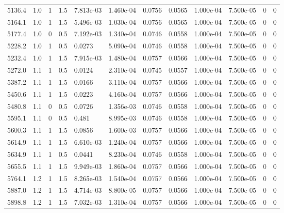 \documentclass[preview]{standalone}
\begin{document}
{{{\begin{tabular}{L{1.2cm}C{1.2cm} C{0.3cm}C{0.5cm} C{1.4cm}C{1.4cm} C{1.4cm}C{1.4cm} C{1.6cm}C{1.6cm} C{1.6cm}C{1.6cm}}
  5136.4  &   1.0  & 1     & 1.5 &  7.813e-03  & 1.460e-04  &  0.0756&   0.0565& 1.000e-04 & 7.500e-05   &  0 & 0  \\ 
  5164.1  &   1.0  & 1     & 1.5 &  5.496e-03  & 1.030e-04  &  0.0756&   0.0565& 1.000e-04 & 7.500e-05   &  0 & 0  \\ 
  5177.4  &   1.0  & 0     & 0.5 &  7.192e-03  & 1.340e-04  &  0.0746&   0.0558& 1.000e-04 & 7.500e-05   &  0 & 0  \\ 
  5228.2  &   1.0  & 1     & 0.5 &  0.0273  & 5.090e-04  &  0.0746&   0.0558& 1.000e-04 & 7.500e-05   &  0 & 0  \\ 
  5232.4  &   1.0  & 1     & 1.5 &  7.915e-03  & 1.480e-04  &  0.0757&   0.0566& 1.000e-04 & 7.500e-05   &  0 & 0  \\ 
  5272.0  &   1.1  & 1     & 0.5 &  0.0124  & 2.310e-04  &  0.0745&   0.0557& 1.000e-04 & 7.500e-05   &  0 & 0  \\ 
  5387.2  &   1.1  & 1     & 1.5 &  0.0166  & 3.110e-04  &  0.0757&   0.0566& 1.000e-04 & 7.500e-05   &  0 & 0  \\ 
  5450.6  &   1.1  & 1     & 1.5 &  0.0223  & 4.160e-04  &  0.0757&   0.0566& 1.000e-04 & 7.500e-05   &  0 & 0  \\ 
  5480.8  &   1.1  & 0     & 0.5 &  0.0726  & 1.356e-03  &  0.0746&   0.0558& 1.000e-04 & 7.500e-05   &  0 & 0  \\ 
  5595.1  &   1.1  & 0     & 0.5 &  0.481  & 8.995e-03  &  0.0746&   0.0558& 1.000e-04 & 7.500e-05   &  0 & 0  \\ 
  5600.3  &   1.1  & 1     & 1.5 &  0.0856  & 1.600e-03  &  0.0757&   0.0566& 1.000e-04 & 7.500e-05   &  0 & 0  \\ 
  5614.9  &   1.1  & 1     & 1.5 &  6.610e-03  & 1.240e-04  &  0.0757&   0.0566& 1.000e-04 & 7.500e-05   &  0 & 0  \\ 
  5634.9  &   1.1  & 1     & 0.5 &  0.0441  & 8.230e-04  &  0.0746&   0.0558& 1.000e-04 & 7.500e-05   &  0 & 0  \\ 
  5655.5  &   1.1  & 1     & 1.5 &  9.949e-03  & 1.860e-04  &  0.0757&   0.0566& 1.000e-04 & 7.500e-05   &  0 & 0  \\ 
  5764.1  &   1.2  & 1     & 1.5 &  8.265e-03  & 1.540e-04  &  0.0757&   0.0566& 1.000e-04 & 7.500e-05   &  0 & 0  \\ 
  5887.0  &   1.2  & 1     & 1.5 &  4.714e-03  & 8.800e-05  &  0.0757&   0.0566& 1.000e-04 & 7.500e-05   &  0 & 0  \\ 
  5898.8  &   1.2  & 1     & 1.5 &  7.032e-03  & 1.310e-04  &  0.0757&   0.0566& 1.000e-04 & 7.500e-05   &  0 & 0  \\ 

\end{tabular}}}}
\end{document}
